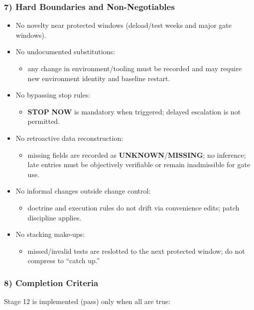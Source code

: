 \documentclass[10pt]{article}
\begin{document}
\subsubsection*{7) Hard Boundaries and Non-Negotiables}

\begin{itemize}
\item No novelty near protected windows (deload/test weeks and major gate windows).
\item No undocumented substitutions:
  \begin{itemize}
  \item any change in environment/tooling must be recorded and may require new environment identity and baseline restart.
  \end{itemize}
\item No bypassing stop rules:
  \begin{itemize}
  \item \textbf{STOP} \textbf{NOW} is mandatory when triggered; delayed escalation is not permitted.
  \end{itemize}
\item No retroactive data reconstruction:
  \begin{itemize}
  \item missing fields are recorded as \textbf{UNKNOWN}/\textbf{MISSING}; no inference; late entries must be objectively verifiable or remain inadmissible for gate use.
  \end{itemize}
\item No informal changes outside change control:
  \begin{itemize}
  \item doctrine and execution rules do not drift via convenience edits; patch discipline applies.
  \end{itemize}
\item No stacking make-ups:
  \begin{itemize}
  \item missed/invalid tests are reslotted to the next protected window; do not compress to “catch up.”
  \end{itemize}
\end{itemize}

\subsubsection*{8) Completion Criteria}

Stage 12 is implemented (pass) only when all are true:
\end{document}
